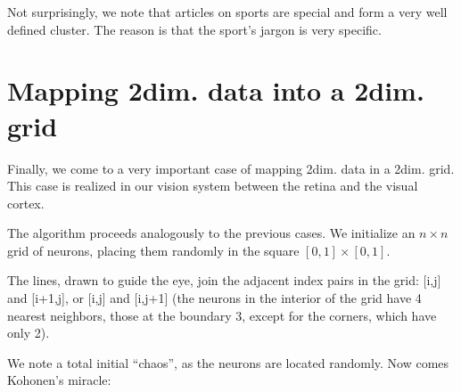 \documentclass[letterpaper,10pt,english]{jupyterBook}
\begin{document}
\noindent{}

\sphinxAtStartPar
Not surprisingly, we note that articles on sports are special and form a very well defined cluster. The reason is that the sport’s jargon is very specific.


\section{Mapping 2\sphinxhyphen{}dim. data into a 2\sphinxhyphen{}dim. grid}
\label{\detokenize{docs/som:mapping-2-dim-data-into-a-2-dim-grid}}
\sphinxAtStartPar
Finally, we come to a very important case of mapping 2\sphinxhyphen{}dim. data in a 2\sphinxhyphen{}dim. grid. This case is realized in our vision system between the retina and the visual cortex.

\sphinxAtStartPar
The algorithm proceeds analogously to the previous cases. We initialize an \(n \times n\) grid of neurons, placing them randomly in the square \([0,1]\times [0,1]\).

\begin{sphinxVerbatim}[commandchars=\\\{\}]
\PYG{p}{[}    \PYG{p}{]}
\end{sphinxVerbatim}

\sphinxAtStartPar
The lines, drawn to guide the eye, join the adjacent index pairs in the grid: {[}i,j{]} and {[}i+1,j{]}, or {[}i,j{]} and {[}i,j+1{]} (the neurons in the interior of the grid have 4 nearest neighbors, those at the boundary 3, except for the corners, which have only 2).

\noindent{}

\sphinxAtStartPar
We note a total initial “chaos”, as the neurons are located randomly. Now comes Kohonen’s miracle:

\begin{sphinxVerbatim}[commandchars=\\\{\}]
   
     
   
  
    
\end{sphinxVerbatim}
\end{document}
